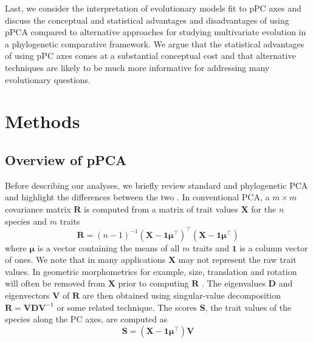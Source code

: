 \documentclass[a4paper,11pt]{article}
\begin{document}
Last, we consider the interpretation of evolutionary models fit to pPC axes and discuss the conceptual and statistical advantages and disadvantages of using pPCA compared to alternative approaches for studying multivariate evolution in a phylogenetic comparative framework. We argue that the statistical advantages of using pPC axes comes at a substantial conceptual cost and that alternative techniques are likely to be much more informative for addressing many evolutionary questions.

\section{Methods}
\subsection{Overview of pPCA}
Before describing our analyses, we briefly review standard and phylogenetic PCA and highlight the differences between the two \citep[see][for a more detailed treatment]{Polly2013}. In conventional PCA, a $m \times m$ covariance matrix $\mathbf{R}$ is computed from a matrix of trait values $\mathbf{X}$ for the $n$ species and $m$ traits
\begin{equation}\label{eq:rpca}
\mathbf{R} = (n-1)^{-1}(\mathbf{X} - \mathbf{1}\boldsymbol{\mu}^\intercal)^\intercal (\mathbf{X} - \mathbf{1}\boldsymbol{\mu}^\intercal)
\end{equation}
where $\boldsymbol{\mu}$ is a vector containing the means of all $m$ traits and $\mathbf{1}$ is a column vector of ones. We note that in many applications $\mathbf{X}$ may not represent the raw trait values. In geometric morphometrics for example, size, translation and rotation will often be removed from $\mathbf{X}$ prior to computing $\mathbf{R}$ \citep{RohlfSlice, Bookstein1997}. The eigenvalues $\mathbf{D}$ and eigenvectors $\mathbf{V}$ of $\mathbf{R}$ are then obtained using singular-value decomposition $\mathbf{R}=\mathbf{V}\mathbf{D}\mathbf{V}^{-1}$ or some related technique. The scores $\mathbf{S}$, the trait values of the species along the PC axes, are computed as
\begin{equation}\label{eq:Spca}
\mathbf{S}=(\mathbf{X} - \mathbf{1}\boldsymbol{\mu}^\intercal)\mathbf{V}
\end{equation}
\end{document}
